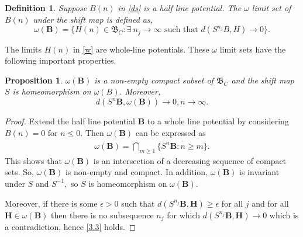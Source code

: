 \documentclass[reqno]{amsart}
\numberwithin{equation}{section}
\newtheorem{prop}{Proposition}[section]
\newtheorem{defi}{Definition}[section]
\begin{document}
\begin{defi} Suppose 	$B(n)$  in \eqref{ds} is a half line potential. The $  \omega $ limit set of  	$B(n)$ under the shift map is defined as,
	\begin{equation} \label{w} 
    \omega( \mathbf B)= \{ H(n)\in \mathfrak B_C : \exists \ n_j \rightarrow \infty \text{ such that } d(S^{n_j}B, H)\rightarrow 0\}. \end{equation}
\end{defi} 
        The limits $H(n)$ in \eqref{w} are whole-line potentials. These $\omega$ limit sets have the following important properties.
            
\begin{prop} $\omega (\mathbf B) $ is a non-empty compact subset of $ \mathfrak B_C $ and the shift map $S$ is homeomorphism on $\omega (B) .$ Moreover, 
\begin{equation}\label{3.3}
d(S^{n}\mathbf B, \omega(\mathbf B))\rightarrow 0, n \rightarrow \infty . \end{equation}
\end{prop}

\begin{proof} Extend the half line potential $\mathbf B$ to a whole line potential by considering $B(n) = 0 $ for $n \leq 0 .$ Then  $\omega(\mathbf B)$ can be expressed as \begin{align*} \omega (\mathbf B) =   \bigcap_{m\geq1} \overline{ \{ S^n \mathbf B : n\geq m\} }.\end{align*}
	 This shows that $\omega(\mathbf B)$ is an intersection of a decreasing sequence of compact sets. So, $\omega(\mathbf B)$ is non-empty and compact. In addition, $\omega(\mathbf B)$ is invariant under $S$ and $S^{-1}, $ so $S$ is   homeomorphism on  $\omega(\mathbf B)$.  
	 
	 Moreover, if there is some $\epsilon > 0$ such that $d(S^{n_j} \mathbf B, \mathbf H) \geq \epsilon $ for all $j$ and for all   $ \mathbf H \in \omega(\mathbf B)$ then there is no subsequence $n_j$ for which  $d(S^{n_j} \mathbf B, \mathbf H)\rightarrow 0 $ which is a contradiction, hence \eqref{3.3} holds. \end{proof}
\end{document}
